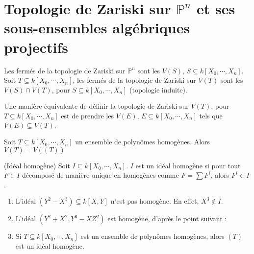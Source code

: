     \section{Topologie de Zariski sur $\mathbb{P}^n$ et ses sous-ensembles algébriques projectifs}
        \begin{defi}
            Les fermés de la topologie de Zariski sur $\mathbb{P}^n$ sont les $V(S)$, $S \subseteq k[X_0, \cdots, X_n]$. Soit $T \subseteq k[X_0, \cdots, X_n]$, les fermés de la topologie de Zariski sur $V(T)$ sont les $V(S) \cap V(T)$, pour $S \subseteq k[X_0, \cdots, X_n]$ (topologie induite).
        \end{defi}
        \begin{remq}
            Une manière équivalente de définir la topologie de Zariski sur $V(T)$, pour $T \subseteq k[X_0, \cdots, X_n]$ est de prendre les $V(E)$, $E \subseteq k[X_0, \cdots, X_n]$ tels que $V(E) \subseteq V(T)$.
        \end{remq}
        \begin{prop}
            Soit $T \subseteq k[X_0, \cdots, X_n]$ un ensemble de polynômes homogènes. Alors $V(T) = V((T))$
        \end{prop}
        \begin{defi} (Idéal homogène)
            Soit $I \subseteq k[X_0, \cdots, X_n]$. $I$ est un idéal homogène si pour tout $F \in I$ décomposé de manière unique en homogènes comme $F = \sum F^i$, alors $F^i \in I$.
        \end{defi}
        \begin{expl}
            \begin{enumerate}
                \item L'idéal $(Y^2 - X^3) \subseteq k[X,Y]$ n'est pas homogène. En effet, $X^3 \notin I$.
                \item L'idéal $(Y^2 + X^2, Y^3 - XZ^2)$ est homogène, d'après le point suivant :
                \item Si $T \subseteq k[X_0, \cdots, X_n]$ est un ensemble de polynômes homogènes, alors $(T)$ est un idéal homogène. 
            \end{enumerate}
        \end{expl}
